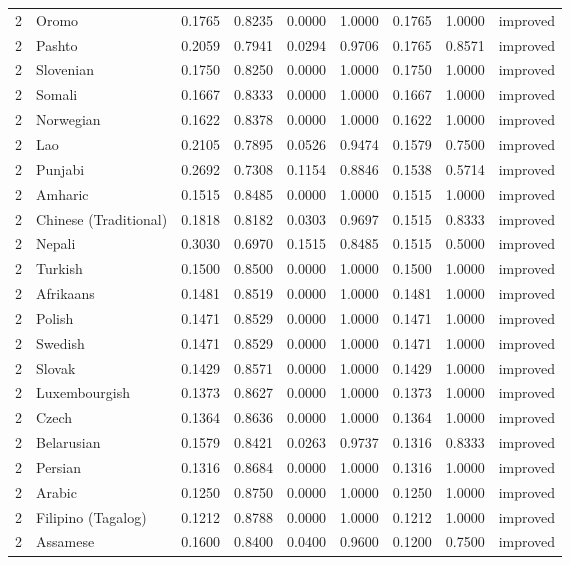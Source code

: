 \begin{tabular}{rlrrrrrrl}
2 & Oromo & 0.1765 & 0.8235 & 0.0000 & 1.0000 & 0.1765 & 1.0000 & improved \\
2 & Pashto & 0.2059 & 0.7941 & 0.0294 & 0.9706 & 0.1765 & 0.8571 & improved \\
2 & Slovenian & 0.1750 & 0.8250 & 0.0000 & 1.0000 & 0.1750 & 1.0000 & improved \\
2 & Somali & 0.1667 & 0.8333 & 0.0000 & 1.0000 & 0.1667 & 1.0000 & improved \\
2 & Norwegian & 0.1622 & 0.8378 & 0.0000 & 1.0000 & 0.1622 & 1.0000 & improved \\
2 & Lao & 0.2105 & 0.7895 & 0.0526 & 0.9474 & 0.1579 & 0.7500 & improved \\
2 & Punjabi & 0.2692 & 0.7308 & 0.1154 & 0.8846 & 0.1538 & 0.5714 & improved \\
2 & Amharic & 0.1515 & 0.8485 & 0.0000 & 1.0000 & 0.1515 & 1.0000 & improved \\
2 & Chinese (Traditional) & 0.1818 & 0.8182 & 0.0303 & 0.9697 & 0.1515 & 0.8333 & improved \\
2 & Nepali & 0.3030 & 0.6970 & 0.1515 & 0.8485 & 0.1515 & 0.5000 & improved \\
2 & Turkish & 0.1500 & 0.8500 & 0.0000 & 1.0000 & 0.1500 & 1.0000 & improved \\
2 & Afrikaans & 0.1481 & 0.8519 & 0.0000 & 1.0000 & 0.1481 & 1.0000 & improved \\
2 & Polish & 0.1471 & 0.8529 & 0.0000 & 1.0000 & 0.1471 & 1.0000 & improved \\
2 & Swedish & 0.1471 & 0.8529 & 0.0000 & 1.0000 & 0.1471 & 1.0000 & improved \\
2 & Slovak & 0.1429 & 0.8571 & 0.0000 & 1.0000 & 0.1429 & 1.0000 & improved \\
2 & Luxembourgish & 0.1373 & 0.8627 & 0.0000 & 1.0000 & 0.1373 & 1.0000 & improved \\
2 & Czech & 0.1364 & 0.8636 & 0.0000 & 1.0000 & 0.1364 & 1.0000 & improved \\
2 & Belarusian & 0.1579 & 0.8421 & 0.0263 & 0.9737 & 0.1316 & 0.8333 & improved \\
2 & Persian & 0.1316 & 0.8684 & 0.0000 & 1.0000 & 0.1316 & 1.0000 & improved \\
2 & Arabic & 0.1250 & 0.8750 & 0.0000 & 1.0000 & 0.1250 & 1.0000 & improved \\
2 & Filipino (Tagalog) & 0.1212 & 0.8788 & 0.0000 & 1.0000 & 0.1212 & 1.0000 & improved \\
2 & Assamese & 0.1600 & 0.8400 & 0.0400 & 0.9600 & 0.1200 & 0.7500 & improved \\

\end{tabular}
